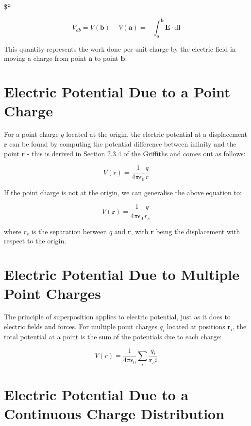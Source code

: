 \documentclass[
  letterpaper,
  DIV=11,
  numbers=noendperiod]{scrreprt}
\begin{document}
\$\$

\[ V_{ab} = V(\mathrm{\mathbf{b}}) − V(\mathrm{\mathbf{a}}) = -\int_{\mathrm{\mathbf{a}}}^{\mathrm{\mathbf{b}}} \mathrm{\mathbf{E}}\cdot \mathrm{d} \mathrm{\mathbf{l}}\]

This quantity represents the work done per unit charge by the electric
field in moving a charge from point \(\mathrm{\mathbf{a}}\) to point
\(\mathrm{\mathbf{b}}\).

\section{Electric Potential Due to a Point
Charge}\label{electric-potential-due-to-a-point-charge}

For a point charge \(q\) located at the origin, the electric potential
at a displacement \(\mathrm{\mathbf{r}}\) can be found by computing the
potential difference between infinity and the point
\(\mathrm{\mathbf{r}}\) - this is derived in Section 2.3.4 of the
Griffiths and comes out as follows:

\[ V(r) = \frac{1}{4\pi\epsilon_0} \frac{q}{r} \]

If the point charge is not at the origin, we can generalise the above
equation to:

\[ V(\mathrm{\mathbf{r}}) = \frac{1}{4\pi\epsilon_0} \frac{q}{r_s} \]

where \(r_s\) is the separation between \(q\) and
\(\mathrm{\mathbf{r}}\), with \(\mathrm{\mathbf{r}}\) being the
displacement with respect to the origin.

\section{Electric Potential Due to Multiple Point
Charges}\label{electric-potential-due-to-multiple-point-charges}

The principle of superposition applies to electric potential, just as it
does to electric fields and forces. For multiple point charges \(q_i\)
located at positions \(\mathrm{\mathbf{r}}_i\), the total potential at a
point is the sum of the potentials due to each
charge:

\[ V(r) = \frac{1}{4\pi \epsilon_0} \sum_{i} \frac{q_i}{\mathrm{\mathbf{r}}_si} \]

\section{Electric Potential Due to a Continuous Charge
Distribution}\label{electric-potential-due-to-a-continuous-charge-distribution}
\end{document}
